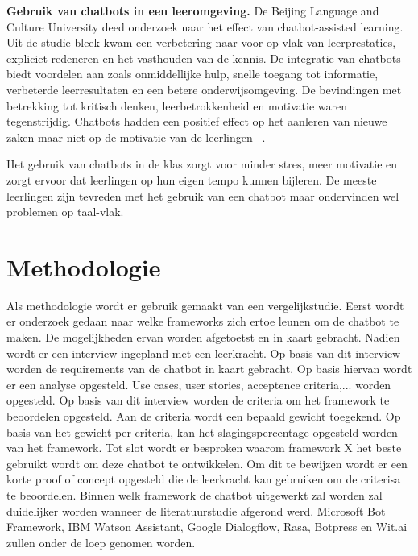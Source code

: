 \textbf{Gebruik van chatbots in een leeromgeving.}\newline
De Beijing Language and Culture University deed onderzoek naar het effect van chatbot-assisted learning. 
Uit de studie bleek kwam een verbetering naar voor op vlak van leerprestaties, expliciet redeneren en het vasthouden van de kennis. 
De integratie van chatbots biedt voordelen aan zoals onmiddellijke hulp, snelle toegang tot informatie, verbeterde leerresultaten en een betere onderwijsomgeving. 
De bevindingen met betrekking tot kritisch denken, leerbetrokkenheid en motivatie waren tegenstrijdig. 
Chatbots hadden een positief effect op het aanleren van nieuwe zaken maar niet op de motivatie van de leerlingen ~\autocite{Deng2023}.

Het gebruik van chatbots in de klas zorgt voor minder stres, meer motivatie en zorgt ervoor dat leerlingen op hun eigen tempo kunnen bijleren. 
De meeste leerlingen zijn tevreden met het gebruik van een chatbot maar ondervinden wel problemen op taal-vlak. ~\autocite{AitBaha2023}





\section{Methodologie}%
\label{sec:methodologie}
Als methodologie wordt er gebruik gemaakt van een vergelijkstudie. Eerst wordt er onderzoek gedaan naar welke frameworks zich ertoe leunen om de chatbot te maken. 
De mogelijkheden ervan worden afgetoetst en in kaart gebracht. 
Nadien wordt er een interview ingepland met een leerkracht. 
Op basis van dit interview worden de requirements van de chatbot in kaart gebracht.
Op basis hiervan wordt er een analyse opgesteld. Use cases, user stories, acceptence criteria,... worden opgesteld.
Op basis van dit interview worden de criteria om het framework te beoordelen opgesteld. 
Aan de criteria wordt een bepaald gewicht toegekend. 
Op basis van het gewicht per criteria, kan het slagingspercentage opgesteld worden van het framework. 
Tot slot wordt er besproken waarom framework X het beste gebruikt wordt om deze chatbot te ontwikkelen. 
Om dit te bewijzen wordt er een korte proof of concept opgesteld die de leerkracht kan gebruiken om de criterisa te beoordelen. 
Binnen welk framework de chatbot uitgewerkt zal worden zal duidelijker worden wanneer de literatuurstudie afgerond werd. 
Microsoft Bot Framework, IBM Watson Assistant, Google Dialogflow, Rasa, Botpress en Wit.ai zullen onder de loep genomen worden. 

